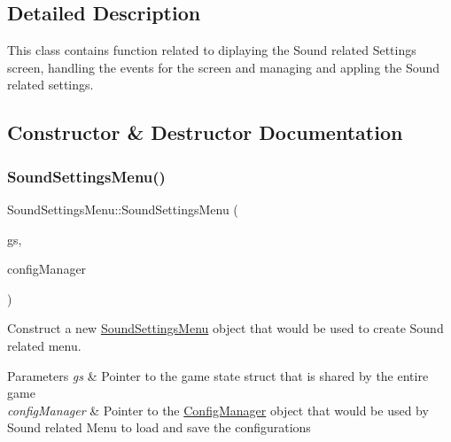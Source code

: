 \subsection{Detailed Description}
This class contains function related to diplaying the Sound related Settings screen, handling the events for the screen and managing and appling the Sound related settings. 



\subsection{Constructor \& Destructor Documentation}
\mbox{\label{class_sound_settings_menu_ac1858f00f1b84e7dea55bf98b9eab011}} 
\subsubsection{\texorpdfstring{SoundSettingsMenu()}{SoundSettingsMenu()}}
{\footnotesize\ttfamily Sound\+Settings\+Menu\+::\+Sound\+Settings\+Menu (\begin{DoxyParamCaption}\item[{\mbox{\hyperlink{struct_game_state}{Game\+State}} $\ast$}]{gs,  }\item[{\mbox{\hyperlink{class_config_manager}{Config\+Manager}} $\ast$}]{config\+Manager }\end{DoxyParamCaption})}



Construct a new \mbox{\hyperlink{class_sound_settings_menu}{Sound\+Settings\+Menu}} object that would be used to create Sound related menu. 


\begin{DoxyParams}{Parameters}
{\em gs} & Pointer to the game state struct that is shared by the entire game \\
\hline
{\em config\+Manager} & Pointer to the \mbox{\hyperlink{class_config_manager}{Config\+Manager}} object that would be used by Sound related Menu to load and save the configurations \\
\hline
\end{DoxyParams}
\mbox{\label{class_sound_settings_menu_a84416928391210116c46bbb1deddf035}} 
